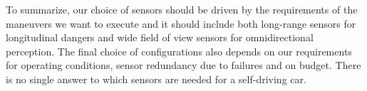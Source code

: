 To summarize, our choice of sensors should be driven by the requirements of the maneuvers we want to execute and it should include 
both long-range sensors for longitudinal dangers and wide field of view sensors for omnidirectional perception. 
The final choice of configurations also depends on our requirements for operating conditions, sensor redundancy due to failures and on budget. 
There is no single answer to which sensors are needed for a self-driving car. 


